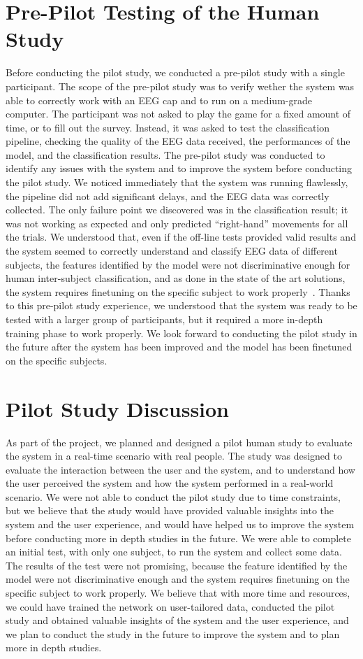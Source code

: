 \section{Pre-Pilot Testing of the Human Study}
Before conducting the pilot study, we conducted a pre-pilot study with a single participant.
The scope of the pre-pilot study was to verify wether the system was able to correctly work with an EEG cap and to run on a medium-grade computer.
The participant was not asked to play the game for a fixed amount of time, or to fill out the survey.
Instead, it was asked to test the classification pipeline, checking the quality of the EEG data received, the performances of the model, and the classification results.
The pre-pilot study was conducted to identify any issues with the system and to improve the system before conducting the pilot study.
We noticed immediately that the system was running flawlessly, the pipeline did not add significant delays, and the EEG data was correctly collected.
The only failure point we discovered was in the classification result; it was not working as expected and only predicted ``right-hand'' movements for all the trials.
We understood that, even if the off-line tests provided valid results and the system seemed to correctly understand and classify EEG data of different subjects, the features identified by the model were not discriminative enough for human inter-subject classification, and as done in the state of the art solutions, the system requires finetuning on the specific subject to work properly~\cite{jia2023excellent}.
Thanks to this pre-pilot study experience, we understood that the system was ready to be tested with a larger group of participants, but it required a more in-depth training phase to work properly.
We look forward to conducting the pilot study in the future after the system has been improved and the model has been finetuned on the specific subjects.

\section{Pilot Study Discussion}
As part of the project, we planned and designed a pilot human study to evaluate the system in a real-time scenario with real people.
The study was designed to evaluate the interaction between the user and the system, and to understand how the user perceived the system and how the system performed in a real-world scenario.
We were not able to conduct the pilot study due to time constraints, but we believe that the study would have provided valuable insights into the system and the user experience, and would have helped us to improve the system before conducting more in depth studies in the future.
We were able to complete an initial test, with only one subject, to run the system and collect some data.
The results of the test were not promising, because the feature identified by the model were not discriminative enough and the system requires finetuning on the specific subject to work properly.
We believe that with more time and resources, we could have trained the network on user-tailored data, conducted the pilot study and obtained valuable insights of the system and the user experience, and we plan to conduct the study in the future to improve the system and to plan more in depth studies.